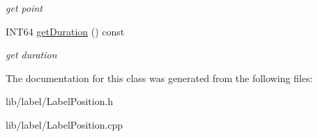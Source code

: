 \begin{DoxyCompactItemize}
\begin{DoxyCompactList}\small\item\em get point \end{DoxyCompactList}\item 
\hypertarget{classsinsy_1_1LabelPosition_aadd9dc47070a0adf3f1fbc62bc7bcddc}{\-I\-N\-T64 \hyperlink{classsinsy_1_1LabelPosition_aadd9dc47070a0adf3f1fbc62bc7bcddc}{get\-Duration} () const }\label{classsinsy_1_1LabelPosition_aadd9dc47070a0adf3f1fbc62bc7bcddc}

\begin{DoxyCompactList}\small\item\em get duration \end{DoxyCompactList}\end{DoxyCompactItemize}


\-The documentation for this class was generated from the following files\-:\begin{DoxyCompactItemize}
\item 
lib/label/\-Label\-Position.\-h\item 
lib/label/\-Label\-Position.\-cpp\end{DoxyCompactItemize}
